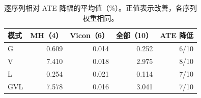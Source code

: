 \begin{table}[tb]
\caption{逐序列相对 ATE 降幅的平均值（\%）。正值表示改善，各序列权重相同。}\label{tab:summary}
\centering\small
\begin{tabular}{lrrrr}
\toprule
模式 & MH（4） & Vicon（6） & 全部（10） & ATE 降低 \\
\midrule
G & 0.609 & 0.014 & 0.252 & 6/10 \\
V & 7.410 & 0.018 & 2.975 & 8/10 \\
L & 0.254 & 0.021 & 0.114 & 7/10 \\
GVL & 7.578 & 0.016 & 3.041 & 7/10 \\
\bottomrule
\end{tabular}
\end{table}
